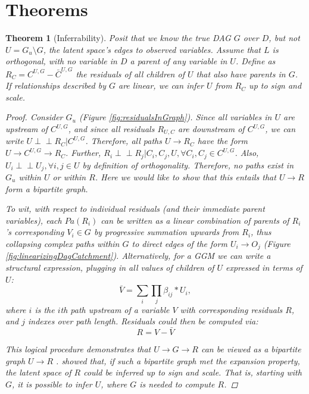 \documentclass[letterpaper]{article}
\newtheorem{theorem}{Theorem}
\begin{document}
\section{Theorems}
\begin{theorem}[Inferrability]
\label{thm:inferrability}
Posit that we know the true DAG $G$ over $D$, but not $U = G_u \setminus G$, the latent space's edges to observed variables.  Assume that $L$ is orthogonal, with no variable in $D$ a parent of any variable in $U$. Define as $R_C = C^{U,G} - \bar{C}^{U,G}$ the residuals of all children of $U$ that also have parents in $G$.  If relationships described by $G$ are linear, we can infer $U$ from $R_C$ up to sign and scale.  

\begin{proof}
Consider $G_u$ (Figure \ref{fig:residualsInGraph}).  Since all
variables in $U$ are upstream of $C^{U,G}$, and since all residuals
$R_{U,C}$ are downstream of $C^{U,G}$, we can write $U
\perp\!\!\!\perp R_C | C^{U,G}$.  Therefore, all paths $U \rightarrow
R_C$ have the form $U \rightarrow C^{U,G} \rightarrow R_C$.  Further,
$R_i \perp\!\!\!\perp R_j | C_i,C_j,U,   \forall C_i, C_j \in
C^{U,G}$. Also, $U_i \perp\!\!\!\perp U_j, \forall i, j \in U$ by
definition of orthogonality.  Therefore, no paths exist in $G_u$
within $U$ or within $R$.  Here we would like to show that this
entails that $U\rightarrow R$ form a bipartite graph.

To wit, with respect to individual residuals (and their immediate parent variables), each $Pa(R_i)$ can be written as a linear combination of parents of $R_i$'s corresponding $V_i \in G$ by progressive summation upwards from $R_i$, thus collapsing complex paths within $G$ to direct edges of the form $U_i \rightarrow O_j$ (Figure \ref{fig:linearizingDagCatchment}).  Alternatively, for a GGM we can write a structural expression, plugging in all values of children of $U$ expressed in terms of $U$:
\begin{equation}
\label{eq:bipartiteRepresentation}
\bar{V} = \sum_i \prod_j \beta_{ij}*U_i,
\end{equation} where $i$ is the $i$th path upstream of a variable $V$ with corresponding residuals $R$, and $j$ indexes over path length.  Residuals could then be computed via:
\begin{equation}
R = V - \bar{V}
\end{equation}

This logical procedure demonstrates that $U\rightarrow G\rightarrow R$
can be viewed as a bipartite graph $U\rightarrow R$ .  \cite{anandkumar_learning_2013} showed that, if such a bipartite graph met the expansion property, the latent space of $R$ could be inferred up to sign and scale.  That is, starting with $G$, it is possible to infer $U$, where $G$ is needed to compute $R$.  


\end{proof}
\end{theorem}
\end{document}
